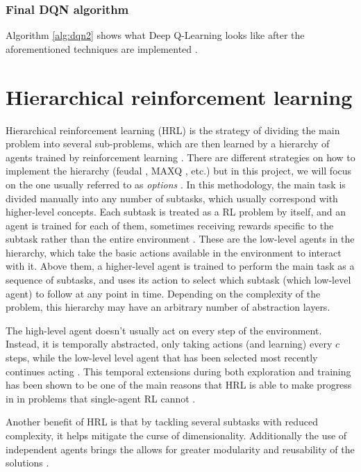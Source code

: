 \subsubsection*{Final DQN algorithm}

Algorithm \ref{alg:dqn2} shows what Deep Q-Learning looks like after the aforementioned techniques are implemented \cite{Mnih:2015}.

\section{Hierarchical reinforcement learning}

Hierarchical reinforcement learning (HRL) is the strategy of dividing the main problem into several sub-problems, which are then learned by a hierarchy of agents trained by reinforcement learning \cite{Barto:2003, Al-Emran:2015, Pateria:2021}. There are different strategies on how to implement the hierarchy (feudal \cite{Vezhnevets:2017}, MAXQ \cite{Dietterich:1999}, etc.) but in this project, we will focus on the one usually referred to as \textit{options} \cite{Sutton:2018}. In this methodology, the main task is divided manually into any number of subtasks, which usually correspond with higher-level concepts. Each subtask is treated as a RL problem by itself, and an agent is trained for each of them, sometimes receiving rewards specific to the subtask rather than the entire environment \cite{Pateria:2021}. These are the low-level agents in the hierarchy, which take the basic actions available in the environment to interact with it. Above them, a higher-level agent is trained to perform the main task as a sequence of subtasks, and uses its action to select which subtask (which low-level agent) to follow at any point in time. Depending on the complexity of the problem, this hierarchy may have an arbitrary number of abstraction layers.

The high-level agent doesn't usually act on every step of the environment. Instead, it is temporally abstracted, only taking actions (and learning) every $c$ steps, while the low-level level agent that has been selected most recently continues acting \cite{Sutton:2018}. This temporal extensions during both exploration and training has been shown to be one of the main reasons that HRL is able to make progress in in problems that single-agent RL cannot \cite{Nachum:2019}.

Another benefit of HRL is that by tackling several subtasks with reduced complexity, it helps mitigate the curse of dimensionality. Additionally the use of independent agents brings the allows for greater modularity and reusability of the solutions \cite{Al-Emran:2015}.

